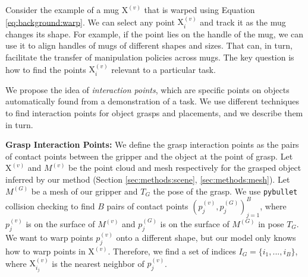 \documentclass{article}
\newcommand{\pcx}[1]{\mathrm{X}^{(#1)}}
\begin{document}


Consider the example of a mug $\pcx{v}$ that is warped using Equation \ref{eq:background:warp}. We can select any point $\pcx{v}_i$ and track it as the mug changes its shape. For example, if the point lies on the handle of the mug, we can use it to align handles of mugs of different shapes and sizes. That can, in turn, facilitate the transfer of manipulation policies across mugs. The key question is how to find the points $\pcx{v}_i$ relevant to a particular task.

We propose the idea of \textit{interaction points}, which are specific points on objects automatically found from a demonstration of a task. We use different techniques to find interaction points for object grasps and placements, and we describe them in turn.

\textbf{Grasp Interaction Points:} We define the grasp interaction points as the pairs of contact points between the gripper and the object at the point of grasp. Let $\pcx{v}$ and $M^{(v)}$ be the point cloud and mesh respectively for the grasped object inferred by our method (Section \ref{sec:methods:scene}, \ref{sec:methods:mesh}). Let $M^{(G)}$ be a mesh of our gripper and $T_G$ the pose of the grasp. We use \texttt{pybullet} collision checking to find $B$ pairs of contact points $ (p_j^{(v)}, p_j^{(G)})_{j=1}^B$, where $p_j^{(v)}$ is on the surface of $M^{(v)}$ and $p_j^{(G)}$ is on the surface of $M^{(G)}$ in pose $T_G$. We want to warp points $p_j^{(v)}$ onto a different shape, but our model only knows how to warp points in $\pcx{v}$. Therefore, we find a set of indices $I_{G} = \{i_1,..., i_B\}$, where $\pcx{v}_{i_j}$ is the nearest neighbor of $p^{(v)}_j$.
\end{document}
